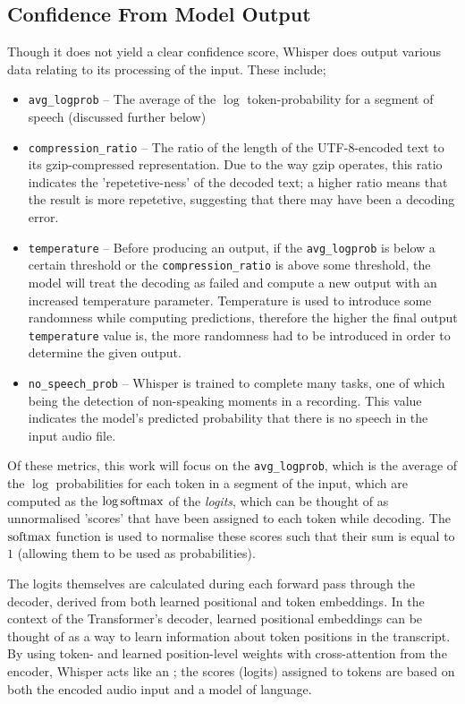 \subsection{Confidence From Model Output}

Though it does not yield a clear confidence score, Whisper does output various data relating to its processing of the input.
These include;

\begin{itemize}
  \item \texttt{avg\_logprob} -- The average of the $\log$ token-probability for a segment of speech (discussed further below)
  \item \texttt{compression\_ratio} -- The ratio of the length of the UTF-8-encoded text to its gzip-compressed representation.
    Due to the way gzip operates, this ratio indicates the 'repetetive-ness' of the decoded text; a higher ratio means that the result is more repetetive, suggesting that there may have been a decoding error.
  \item \texttt{temperature} -- Before producing an output, if the \texttt{avg\_logprob} is below a certain threshold or the \texttt{compression\_ratio} is above some threshold, the model will treat the decoding as failed and compute a new output with an increased temperature parameter.
    Temperature is used to introduce some randomness while computing predictions, therefore the higher the final output \texttt{temperature} value is, the more randomness had to be introduced in order to determine the given output.
  \item \texttt{no\_speech\_prob} -- Whisper is trained to complete many tasks, one of which being the detection of non-speaking moments in a recording.
    This value indicates the model's predicted probability that there is no speech in the input audio file.
\end{itemize}

Of these metrics, this work will focus on the \texttt{avg\_logprob}, which is the average of the $\log$ probabilities for each token in a segment of the input, which are computed as the $\log \operatorname{softmax}$ of the \emph{logits}, which can be thought of as unnormalised 'scores' that have been assigned to each token while decoding.
The $\operatorname{softmax}$ function is used to normalise these scores such that their sum is equal to $1$ (allowing them to be used as probabilities).

The logits themselves are calculated during each forward pass through the decoder, derived from both learned positional and token embeddings.
In the context of the Transformer's decoder, learned positional embeddings can be thought of as a way to learn information about token positions in the transcript\cite{wang2020position}.
By using token- and learned position-level weights with cross-attention from the encoder\cite{vaswani2017attention}, Whisper acts like an \cite{whisper}; the scores (logits) assigned to tokens are based on both the encoded audio input and a model of language.

